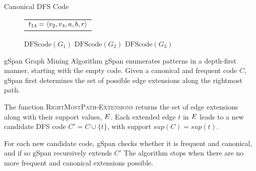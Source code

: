 \begin{frame}[fragile]{Canonical DFS Code}
\begin{figure}
{{{{{\begin{tabular}{c}
        $t_{14} = \langle v_2,v_4,a,b,r \rangle$\\
      \end{tabular}}
    \hspace{0.25in}
    \hspace{0.25in}
      }}
   }
  }
\end{figure}
  \vspace{-0.1in} 
\begin{figure}
    \normalsize
    \centerline{\hspace{0.35in}$\text{DFScode}(G_1)$
    \hspace{0.75in}$\text{DFScode}(G_2)$
    \hspace{0.65in}$\text{DFScode}(G_3)$}
\end{figure}
\end{frame}

\begin{frame}{gSpan Graph Mining Algorithm}
gSpan enumerates patterns in a depth-f\/{i}rst manner, starting with the
empty code.  Given a canonical and frequent code $C$, gSpan f\/{i}rst
determines the set of possible edge extensions  along the rightmost
path.

\medskip
The function \textsc{RightMostPath-Extensions}
returns the set of edge extensions along with their support values, ${\relax E}$.
Each extended edge $t$ in ${\relax E}$ leads to a new candidate
DFS code $C' = C \cup
\{t\}$, with support $sup(C) = sup(t)$.


\medskip
For each new candidate code,
gSpan checks whether it is frequent and
canonical, and if so gSpan recursively extends $C'$
The
algorithm stops when there are no more frequent and canonical extensions
possible.
\end{frame}



